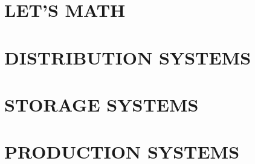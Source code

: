 \documentclass{book}
\begin{document}
\part{LET'S MATH}











\part{DISTRIBUTION SYSTEMS}





\part{STORAGE SYSTEMS}





\part{PRODUCTION SYSTEMS}




\end{document}

